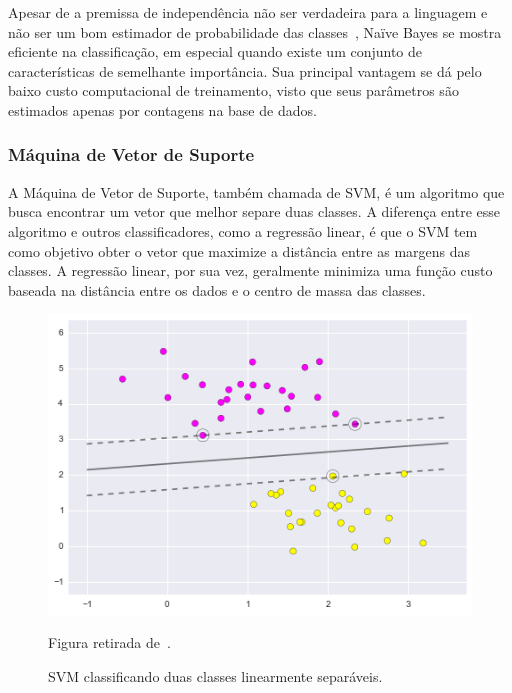 Apesar de a premissa de independência não ser verdadeira para a linguagem e não
ser um bom estimador de probabilidade das classes~\cite{schutze08}, Naïve Bayes se
mostra eficiente na classificação, em especial quando existe um conjunto de
características de semelhante importância.
Sua principal vantagem se dá pelo baixo custo computacional de treinamento, visto
que seus parâmetros são estimados apenas por contagens na base de dados.

\subsubsection{Máquina de Vetor de Suporte}
\label{sec:svm}

A Máquina de Vetor de Suporte, também chamada de SVM, é um algoritmo que busca
encontrar um vetor que melhor separe duas classes.
A diferença entre esse algoritmo e outros classificadores, como a regressão
linear, é que o SVM tem como objetivo obter o vetor que maximize a distância entre
as margens das classes.
A regressão linear, por sua vez, geralmente minimiza uma função custo baseada na
distância entre os dados e o centro de massa das classes.

\begin{figure}[h]
\begin{center} {
    \begin{center}
    \includegraphics[scale=0.6]{images/svm.png}
    \caption{SVM classificando duas classes linearmente separáveis.}
    \small Figura retirada de~\cite{vanderplas15}.
    \label{fig:svm}
    \end{center}
}
\end{center}
\end{figure}

